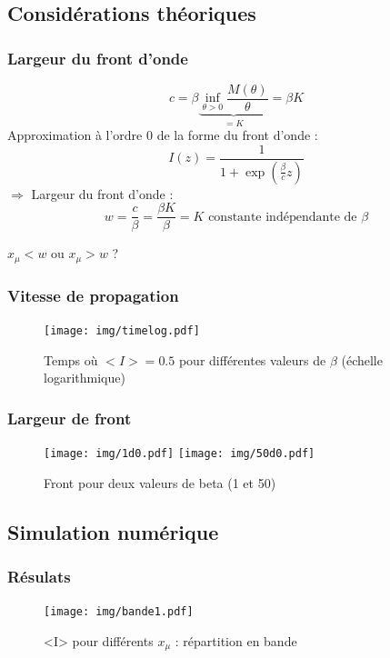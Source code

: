 \documentclass[handout]{beamer}
\begin{document}
\subsection[Théorique]{Considérations théoriques}
\begin{frame}
	\frametitle{Largeur du front d'onde}
\begin{equation}
	c=\beta\underbrace{\inf_{\theta>0} \frac{M(\theta)}{\theta} }_{=K}= \beta K
\end{equation}
Approximation à l'ordre 0 de la forme du front d'onde :
\begin{equation}
	I(z)=\frac{1}{1+\exp\left(\frac{\beta}{c}z\right)}
\end{equation}
$\Rightarrow$ Largeur du front d'onde :
\begin{equation}
	w=\frac{c}{\beta}=\frac{\beta K}{\beta}=K \text{ constante indépendante de }\beta
\end{equation}
\begin{center}$x_{\mu}<w$ ou $x_{\mu}>w$ ? \end{center}
\end{frame}

\begin{frame}
	\frametitle{Vitesse de propagation}
\begin{figure}[!h]
\centering
	\texttt{[image: img/timelog.pdf]}
	\caption{Temps où $<I>=0.5$ pour différentes valeurs de $\beta$ (échelle logarithmique)}
\end{figure}
\end{frame}

\begin{frame}
	\frametitle{Largeur de front}
\begin{figure}[!h]
\centering
	\texttt{[image: img/1d0.pdf]}
	\texttt{[image: img/50d0.pdf]}
	\caption{Front pour deux valeurs de beta (1 et 50)}
\end{figure}
\end{frame}


\subsection[Numérique]{Simulation numérique}
\begin{frame}
	\frametitle{Résulats}
\begin{figure}[!h]
\centering
	\texttt{[image: img/bande1.pdf]}
	\caption{<I> pour différents $x_\mu$ : répartition en bande}
\end{figure}
\end{frame}
\end{document}
